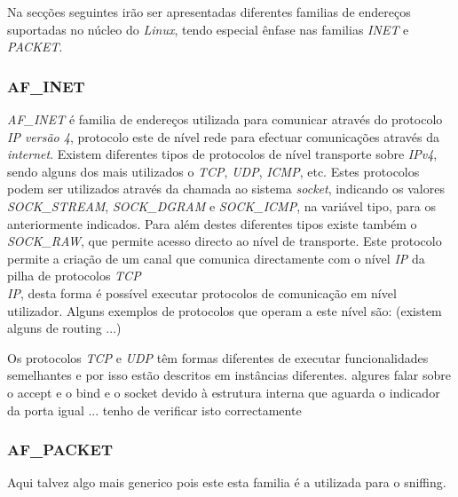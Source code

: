 Na secções seguintes irão ser apresentadas diferentes familias de endereços suportadas no núcleo do \textit{Linux}, tendo especial ênfase nas familias \textit{INET} e \textit{PACKET}.


\subsubsection{AF\_INET}

\textit{AF\_INET} é familia de endereços utilizada para comunicar através do protocolo \textit{IP versão 4}, protocolo este de nível rede para efectuar comunicações através da \textit{internet}.
 Existem diferentes tipos de protocolos de nível transporte sobre \textit{IPv4}, sendo alguns dos mais utilizados o \textit{TCP}, \textit{UDP}, \textit{ICMP}, etc.
 Estes protocolos podem ser utilizados através da chamada ao sistema \textit{socket}, indicando os valores \textit{SOCK\_STREAM}, \textit{SOCK\_DGRAM} e \textit{SOCK\_ICMP}, na variável tipo, para os anteriormente indicados.
 Para além destes diferentes tipos existe também o \textit{SOCK\_RAW}, que permite acesso directo ao nível de transporte.
 Este protocolo permite a criação de um canal que comunica directamente com o nível \textit{IP} da pilha de protocolos \textit{TCP\\IP}, desta forma é possível executar protocolos de comunicação em nível utilizador.
 Alguns exemplos de protocolos que operam a este nível são: (existem alguns de routing ...)


Os protocolos \textit{TCP} e \textit{UDP} têm formas diferentes de executar funcionalidades semelhantes e por isso estão descritos em instâncias diferentes.
algures falar sobre o accept e o bind e o socket devido à estrutura interna que aguarda o indicador da porta igual ... tenho de verificar isto correctamente
\subsubsection{AF\_PACKET}

Aqui talvez algo mais generico pois este esta familia é a utilizada para o sniffing.

